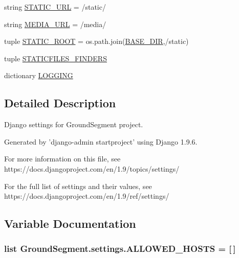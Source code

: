 \begin{DoxyCompactItemize}
\item 
string \hyperlink{namespace_ground_segment_1_1settings_ae91e0e33f45cae10b6f1f4aef7862e1a}{S\+T\+A\+T\+I\+C\+\_\+\+U\+R\+L} = \textquotesingle{}/static/\textquotesingle{}
\item 
string \hyperlink{namespace_ground_segment_1_1settings_a482e3bb1fe2f21c677c69b69e5b5798a}{M\+E\+D\+I\+A\+\_\+\+U\+R\+L} = \textquotesingle{}/media/\textquotesingle{}
\item 
tuple \hyperlink{namespace_ground_segment_1_1settings_a99341177ff9700bce98aaa850c09412d}{S\+T\+A\+T\+I\+C\+\_\+\+R\+O\+O\+T} = os.\+path.\+join(\hyperlink{namespace_ground_segment_1_1settings_a96d9de6863371f2594631eee01ef0600}{B\+A\+S\+E\+\_\+\+D\+I\+R},\textquotesingle{}/static\textquotesingle{})
\item 
tuple \hyperlink{namespace_ground_segment_1_1settings_abf83e5e190e2a3cf3ae8d8bac305e750}{S\+T\+A\+T\+I\+C\+F\+I\+L\+E\+S\+\_\+\+F\+I\+N\+D\+E\+R\+S}
\item 
dictionary \hyperlink{namespace_ground_segment_1_1settings_ac72e34b0dd6d700d555daae97bae8118}{L\+O\+G\+G\+I\+N\+G}
\end{DoxyCompactItemize}


\subsection{Detailed Description}
\begin{DoxyVerb}Django settings for GroundSegment project.

Generated by 'django-admin startproject' using Django 1.9.6.

For more information on this file, see
https://docs.djangoproject.com/en/1.9/topics/settings/

For the full list of settings and their values, see
https://docs.djangoproject.com/en/1.9/ref/settings/
\end{DoxyVerb}
 

\subsection{Variable Documentation}
\hypertarget{namespace_ground_segment_1_1settings_ae76a78e05b49fb40b628ba756d926bc9}{}
\subsubsection[{A\+L\+L\+O\+W\+E\+D\+\_\+\+H\+O\+S\+T\+S}]{\setlength{\rightskip}{0pt plus 5cm}list Ground\+Segment.\+settings.\+A\+L\+L\+O\+W\+E\+D\+\_\+\+H\+O\+S\+T\+S = \mbox{[}$\,$\mbox{]}}\label{namespace_ground_segment_1_1settings_ae76a78e05b49fb40b628ba756d926bc9}


